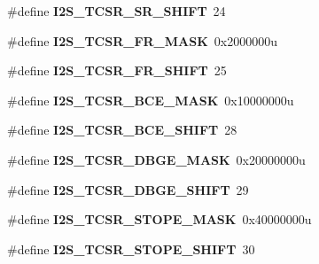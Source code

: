 \begin{DoxyCompactItemize}
\item 
\#define {\bfseries I2\+S\+\_\+\+T\+C\+S\+R\+\_\+\+S\+R\+\_\+\+S\+H\+I\+FT}~24\hypertarget{group__I2S__Register__Masks_gab1a40505d50cdd19b7e37eaa0d6cc184}{}\label{group__I2S__Register__Masks_gab1a40505d50cdd19b7e37eaa0d6cc184}

\item 
\#define {\bfseries I2\+S\+\_\+\+T\+C\+S\+R\+\_\+\+F\+R\+\_\+\+M\+A\+SK}~0x2000000u\hypertarget{group__I2S__Register__Masks_gab914972c0af99c736c0873d7c9f325f6}{}\label{group__I2S__Register__Masks_gab914972c0af99c736c0873d7c9f325f6}

\item 
\#define {\bfseries I2\+S\+\_\+\+T\+C\+S\+R\+\_\+\+F\+R\+\_\+\+S\+H\+I\+FT}~25\hypertarget{group__I2S__Register__Masks_gaee3fc16502863ff4fa31702ca5add676}{}\label{group__I2S__Register__Masks_gaee3fc16502863ff4fa31702ca5add676}

\item 
\#define {\bfseries I2\+S\+\_\+\+T\+C\+S\+R\+\_\+\+B\+C\+E\+\_\+\+M\+A\+SK}~0x10000000u\hypertarget{group__I2S__Register__Masks_ga1a283a2875596890e8d014ba29a2d764}{}\label{group__I2S__Register__Masks_ga1a283a2875596890e8d014ba29a2d764}

\item 
\#define {\bfseries I2\+S\+\_\+\+T\+C\+S\+R\+\_\+\+B\+C\+E\+\_\+\+S\+H\+I\+FT}~28\hypertarget{group__I2S__Register__Masks_gabcf492ab7f9cc04accd4b8d144a195d8}{}\label{group__I2S__Register__Masks_gabcf492ab7f9cc04accd4b8d144a195d8}

\item 
\#define {\bfseries I2\+S\+\_\+\+T\+C\+S\+R\+\_\+\+D\+B\+G\+E\+\_\+\+M\+A\+SK}~0x20000000u\hypertarget{group__I2S__Register__Masks_ga168b4f72e1d68208f211020224bc4f1d}{}\label{group__I2S__Register__Masks_ga168b4f72e1d68208f211020224bc4f1d}

\item 
\#define {\bfseries I2\+S\+\_\+\+T\+C\+S\+R\+\_\+\+D\+B\+G\+E\+\_\+\+S\+H\+I\+FT}~29\hypertarget{group__I2S__Register__Masks_ga45053916a88f0ce8d3a0798b7529f976}{}\label{group__I2S__Register__Masks_ga45053916a88f0ce8d3a0798b7529f976}

\item 
\#define {\bfseries I2\+S\+\_\+\+T\+C\+S\+R\+\_\+\+S\+T\+O\+P\+E\+\_\+\+M\+A\+SK}~0x40000000u\hypertarget{group__I2S__Register__Masks_ga2692628bf911b8951e8f77dbd6809f87}{}\label{group__I2S__Register__Masks_ga2692628bf911b8951e8f77dbd6809f87}

\item 
\#define {\bfseries I2\+S\+\_\+\+T\+C\+S\+R\+\_\+\+S\+T\+O\+P\+E\+\_\+\+S\+H\+I\+FT}~30\hypertarget{group__I2S__Register__Masks_ga931d31ce7c806e53554e29d7cf0db6ed}{}\label{group__I2S__Register__Masks_ga931d31ce7c806e53554e29d7cf0db6ed}


\end{DoxyCompactItemize}
